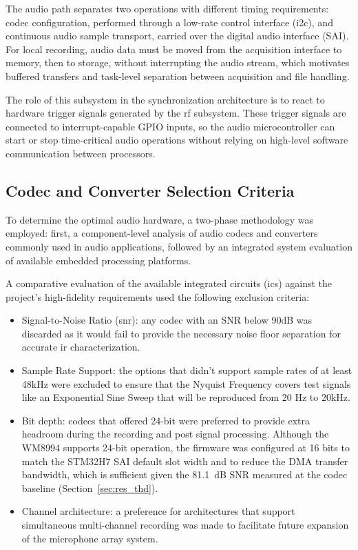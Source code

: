 The audio path separates two operations with different timing requirements: codec configuration, performed through a low-rate control interface (\acrshort{i2c}), and continuous audio sample transport, carried over the digital audio interface (SAI). For local recording, audio data must be moved from the acquisition interface to memory, then to storage, without interrupting the audio stream, which motivates buffered transfers and task-level separation between acquisition and file handling.
 
The role of this subsystem in the synchronization architecture is to react to hardware trigger signals generated by the \acrshort{rf} subsystem. These trigger signals are connected to interrupt-capable GPIO inputs, so the audio microcontroller can start or stop time-critical audio operations without relying on high-level software communication between processors.


\subsection{Codec and Converter Selection Criteria}
\label{sec:codec_selection}
To determine the optimal audio hardware, a two-phase methodology was employed: first, a component-level analysis of audio codecs and converters commonly used in audio applications, followed by an integrated system evaluation of available embedded processing platforms.

A comparative evaluation of the available integrated circuits (\acrshort{ic}s) against the project's high-fidelity requirements used the following exclusion criteria: 
\begin{itemize}
    \item Signal-to-Noise Ratio (\acrshort{snr}): any codec with an SNR below 90dB was discarded as it would fail to provide the necessary noise floor separation for accurate \acrfull{ir} characterization.
    \item Sample Rate Support: the options that didn't support sample rates of at least 48kHz were excluded to ensure that the Nyquist Frequency covers test signals like an Exponential Sine Sweep that will be reproduced from 20 Hz to 20kHz.
    \item Bit depth: codecs that offered 24-bit were preferred to provide extra headroom during the recording and post signal processing. Although the WM8994 supports 24-bit operation, the firmware was configured at 16 bits to match the STM32H7 SAI default slot width and to reduce the DMA transfer bandwidth, which is sufficient given the 81.1~dB SNR measured at the codec baseline (Section~\ref{sec:res_thd}).
    \item Channel architecture: a preference for architectures that support simultaneous multi-channel recording was made to facilitate future expansion of the microphone array system. 
\end{itemize}


